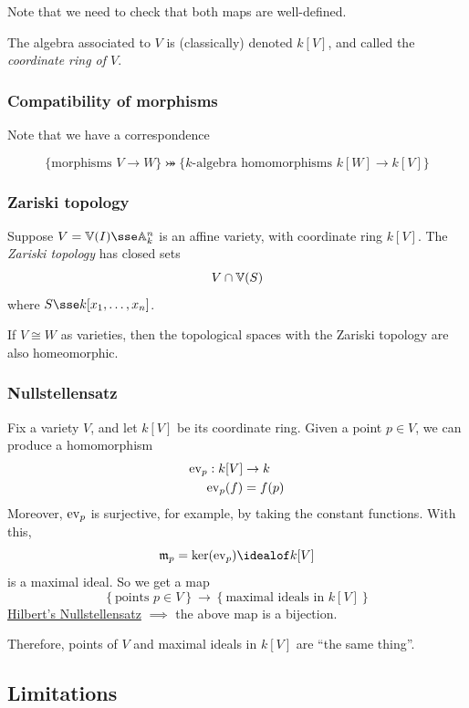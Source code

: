 \documentclass{article}
\begin{document}
Note that we need to check that both maps are well-defined.

\begin{notation}
    The algebra associated to \(V\) is (classically) denoted \(k[V]\), and called the \emph{coordinate ring of \(V\)}.
\end{notation}

\subsubsection*{Compatibility of morphisms}

Note that we have a correspondence

\[\{\text{morphisms }V \to W\} \bij \{k\text{-algebra homomorphisms }k[W] \to k[V]\}\]

\subsubsection*{Zariski topology}

Suppose \(V = \van(I) \sse \aff k n\) is an affine variety, with coordinate ring \(k[V]\). The \emph{Zariski topology} has closed sets
\[V \cap \mathbb{V}(S)\]
where \(S \sse k\poly n\).

If \(V \cong W\) as varieties, then the topological spaces with the Zariski topology are also homeomorphic.

\subsubsection*{Nullstellensatz}

Fix a variety \(V\), and let \(k[V]\) be its coordinate ring. Given a point \(p \in V\), we can produce a homomorphism
\begin{align*}
    \mathrm{ev}_p : k[V] &\to k \\
    \mathrm{ev}_p(f) &= f(p)
\end{align*}
Moreover, \(\mathrm{ev}_p\) is surjective, for example, by taking the constant functions. With this,
\[\mfm_p = \ker(\ev_p) \idealof k[V]\]
is a maximal ideal. So we get a map
\[\left\{\text{points }p \in V\right\} \to \left\{\text{maximal ideals in }k[V]\right\}\]
\underline{Hilbert's Nullstellensatz} \(\implies\) the above map is a bijection.

Therefore, points of \(V\) and maximal ideals in \(k[V]\) are ``the same thing''.

\subsection{Limitations}
\end{document}

